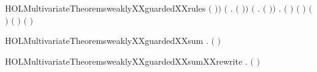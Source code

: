 \begin{SaveVerbatim}{HOLMultivariateTheoremsweaklyXXguardedXXrules}
          \ensuremath{(} \HOLSymConst{\ensuremath{\mid}} \ensuremath{)}\ensuremath{)} \HOLSymConst{\HOLTokenConj{}}
   \ensuremath{(}\HOLSymConst{\HOLTokenForall{}}  .    \HOLSymConst{\HOLTokenImp{}}   \ensuremath{(}  \ensuremath{)}\ensuremath{)} \HOLSymConst{\HOLTokenConj{}}
   \ensuremath{(}\HOLSymConst{\HOLTokenForall{}}  .
           \HOLSymConst{\HOLTokenImp{}}   \ensuremath{(}  \ensuremath{)}\ensuremath{)} \HOLSymConst{\HOLTokenConj{}}
   \HOLSymConst{\HOLTokenForall{}}  .
       \HOLSymConst{\HOLTokenNeg{}}   \HOLSymConst{\HOLTokenConj{}}  \ensuremath{(} \ensuremath{)} \ensuremath{(} \ensuremath{)} \HOLSymConst{\HOLTokenConj{}}
        \ensuremath{(} \ensuremath{)} \ensuremath{(} \ensuremath{)} \HOLSymConst{\HOLTokenImp{}}
         \ensuremath{(}  \ensuremath{)}
\end{SaveVerbatim}
\newcommand{\HOLMultivariateTheoremsweaklyXXguardedXXrules}{\UseVerbatim{HOLMultivariateTheoremsweaklyXXguardedXXrules}}
\begin{SaveVerbatim}{HOLMultivariateTheoremsweaklyXXguardedXXsum}
\HOLTokenTurnstile{} \HOLSymConst{\HOLTokenForall{}}  .
         \ensuremath{(} \HOLSymConst{\ensuremath{+}} \ensuremath{)} \HOLSymConst{\HOLTokenImp{}}
          \HOLSymConst{\HOLTokenConj{}}   
\end{SaveVerbatim}
\newcommand{\HOLMultivariateTheoremsweaklyXXguardedXXsum}{\UseVerbatim{HOLMultivariateTheoremsweaklyXXguardedXXsum}}
\begin{SaveVerbatim}{HOLMultivariateTheoremsweaklyXXguardedXXsumXXrewrite}
\HOLTokenTurnstile{} \HOLSymConst{\HOLTokenForall{}}  .
         \ensuremath{(} \HOLSymConst{\ensuremath{+}} \ensuremath{)} \HOLSymConst{\HOLTokenEquiv{}}
          \HOLSymConst{\HOLTokenConj{}}   
\end{SaveVerbatim}
